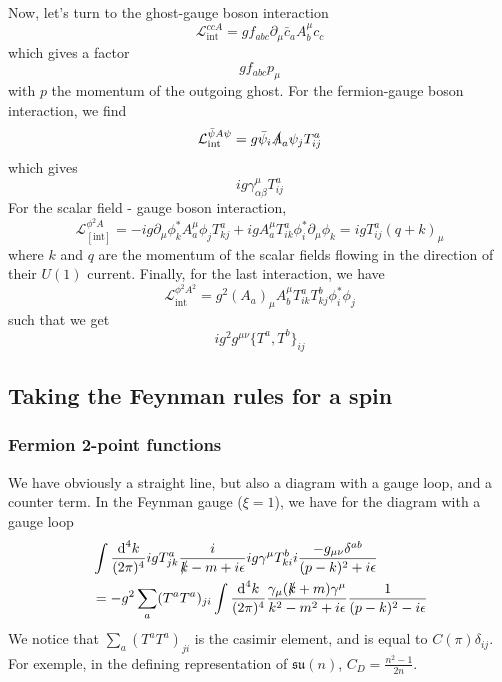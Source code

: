 \documentclass[a4paper]{book}
\theoremstyle{definition}
\theoremstyle{remark}
\begin{document}
Now, let's turn to the ghost-gauge boson interaction 
\begin{equation}
    \mathcal L^{ccA}_{\text{int}} = gf_{abc}\partial_\mu \bar c_a A^\mu_b c_c 
\end{equation}
which gives a factor 
\begin{equation}
    g f_{abc} p_\mu
\end{equation}
with $p$ the momentum of the outgoing ghost. For the fermion-gauge boson interaction, we find 
\begin{equation}
    \mathcal L^{\bar \psi A \psi}_{\text{int}} = g \bar \psi _i \slashed{A}_a \psi _j T^a_{ij}
\end{equation}
which gives 
\begin{equation}
    ig \gamma^\mu_{\alpha \beta}T^a_{ij}
\end{equation}
For the scalar field - gauge boson interaction, 
\begin{equation}
    \mathcal L_[\text{int}]^{\phi^2A} = -ig \partial_\mu \phi_k^* A^\mu_a \phi_j T^a_{kj} + ig A^\mu_a T^a_{ik}\phi_i^* \partial_\mu \phi_k = ig T^a_{ij}(q+k)_\mu
\end{equation}
where $k$ and $q$ are the momentum of the scalar fields flowing in the direction of their $U(1)$ current. Finally, for the last interaction, we have 
\begin{equation}
    \mathcal L^{\phi^2A^2}_{\text{int}} = g^2 (A_a)_\mu A^\mu_b T^a_{ik}T^b_{kj} \phi^*_i \phi_j
\end{equation}
such that we get 
\begin{equation}
    ig^2 g^{\mu\nu} \{T^a, T^b\}_{ij}
\end{equation}
\subsection{Taking the Feynman rules for a spin}
\subsubsection{Fermion 2-point functions} 
We have obviously a straight line, but also a diagram with a gauge loop, and a counter term. In the Feynman gauge ($\xi = 1$), we have for the diagram with a gauge loop 
\begin{equation}
    \begin{aligned}
        &\int \frac{\text{d}^4k}{(2\pi)^4} ig T^a_{jk}\frac{i}{\slashed{k} - m + i\epsilon }ig \gamma^\mu T^b_{ki} i\frac{-g_{\mu\nu}\delta^{ab}}{(p-k)^2 + i\epsilon} \\ 
        &= -g^2 \sum_a (T^a T^a)_{ji} \int \frac{\text{d}^4k}{(2\pi)^4}  \frac{\gamma_\mu (\slashed{k} + m)\gamma^\mu}{k^2 - m^2 + i\epsilon } \frac{1}{(p-k)^2 - i\epsilon} 
    \end{aligned}
\end{equation}
We notice that $\sum_a (T^a T^a)_{ji}$ is the casimir element, and is equal to $C(\pi)\delta_{ij}$. For exemple, in the defining representation of $\mathfrak{su}(n)$, $C_D = \frac{n^2 - 1}{2n}$. 
\end{document}
